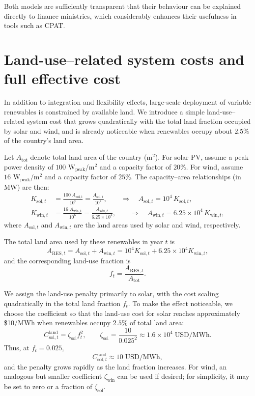 \documentclass[preprint,authoryear,12pt]{elsarticle}
\begin{document}
Both models are sufficiently transparent that their behaviour can be explained directly to finance
ministries, which considerably enhances their usefulness in tools such as CPAT.

\newpage
\section{Land-use–related system costs and full effective cost}

In addition to integration and flexibility effects, large-scale deployment of variable renewables
is constrained by available land. We introduce a simple land-use–related system cost that grows
quadratically with the total land fraction occupied by solar and wind, and is already noticeable
when renewables occupy about $2.5\%$ of the country’s land area.

Let $A_{\text{tot}}$ denote total land area of the country (m$^2$). For solar PV, assume a peak
power density of $100$ W$_{\text{peak}}$/m$^2$ and a capacity factor of $20\%$. For wind, assume
$16$ W$_{\text{peak}}$/m$^2$ and a capacity factor of $25\%$. The capacity–area relationships
(in MW) are then:
\begin{align*}
    K_{\text{sol},t} &= \frac{100 \; A_{\text{sol},t}}{10^6}
                     = \frac{A_{\text{sol},t}}{10^4},
    \qquad \Rightarrow \quad
    A_{\text{sol},t} = 10^4\,K_{\text{sol},t},\\[4pt]
    K_{\text{win},t} &= \frac{16 \; A_{\text{win},t}}{10^6}
                     = \frac{A_{\text{win},t}}{6.25\times 10^4},
    \qquad \Rightarrow \quad
    A_{\text{win},t} = 6.25\times 10^4\,K_{\text{win},t},
\end{align*}
where $A_{\text{sol},t}$ and $A_{\text{win},t}$ are the land areas used by solar and wind,
respectively.

The total land area used by these renewables in year $t$ is
\[
    A_{\text{RES},t}
    = A_{\text{sol},t} + A_{\text{win},t}
    = 10^4 K_{\text{sol},t} + 6.25\times 10^4 K_{\text{win},t},
\]
and the corresponding land-use fraction is
\[
    f_t = \frac{A_{\text{RES},t}}{A_{\text{tot}}}.
\]

We assign the land-use penalty primarily to solar, with the cost scaling quadratically in the
total land fraction $f_t$. To make the effect noticeable, we choose the coefficient so that the
land-use cost for solar reaches approximately \$10/MWh when renewables occupy $2.5\%$ of
total land area:
\[
    C_{\text{sol},t}^{\text{land}}
    = \zeta_{\text{sol}} f_t^2,
    \qquad
    \zeta_{\text{sol}}
    = \frac{10}{0.025^2}
    \approx 1.6\times 10^4 \;\text{USD/MWh}.
\]
Thus, at $f_t = 0.025$,
\[
    C_{\text{sol},t}^{\text{land}} \approx 10 \;\text{USD/MWh},
\]
and the penalty grows rapidly as the land fraction increases. For wind, an analogous but
smaller coefficient $\zeta_{\text{win}}$ can be used if desired; for simplicity, it may be set to zero
or a fraction of $\zeta_{\text{sol}}$.
\end{document}
